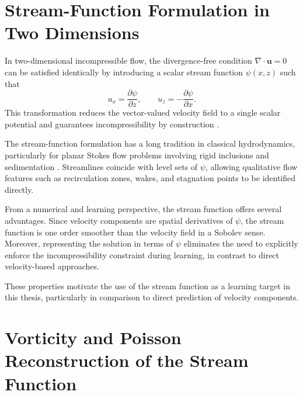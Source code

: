 \section{Stream-Function Formulation in Two Dimensions}
\label{sec:stream_function}

In two-dimensional incompressible flow, the divergence-free condition
$\nabla \cdot \mathbf{u} = 0$ can be satisfied identically by introducing a
scalar stream function $\psi(x,z)$ such that
\begin{equation}
\label{eq:stream_function_def}
u_x = \frac{\partial \psi}{\partial z},
\qquad
u_z = -\frac{\partial \psi}{\partial x}.
\end{equation}
This transformation reduces the vector-valued velocity field to a single
scalar potential and guarantees incompressibility by construction \parencite{happel_low_1983}.

The stream-function formulation has a long tradition in classical
hydrodynamics, particularly for planar Stokes flow problems involving rigid
inclusions and sedimentation \parencite{happel_low_1983,ladd_numerical_nodate,uhlmann_sedimentation_2014}.
Streamlines
coincide with level sets of $\psi$, allowing qualitative flow features such as
recirculation zones, wakes, and stagnation points to be identified directly.

From a numerical and learning perspective, the stream function offers several
advantages. Since velocity components are spatial derivatives of $\psi$, the stream
function is one order smoother than the velocity field in a Sobolev sense. Moreover, representing the solution in terms of
$\psi$ eliminates the need to explicitly enforce the incompressibility
constraint during learning, in contrast to direct velocity-based approaches.

These properties motivate the use of the stream function as a learning target
in this thesis, particularly in comparison to direct prediction of velocity
components.

\section{Vorticity and Poisson Reconstruction of the Stream Function}
\label{sec:poisson_psi}

